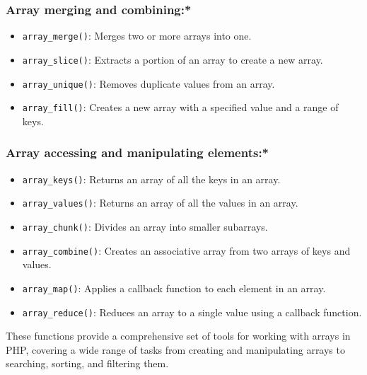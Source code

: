 \documentclass[11pt]{article}
\begin{document}
\subsubsection{Array merging and combining:*}
\label{sec:orgc3fad54}
\begin{itemize}
\item \texttt{array\_merge()}: Merges two or more arrays into one.
\item \texttt{array\_slice()}: Extracts a portion of an array to create a new array.
\item \texttt{array\_unique()}: Removes duplicate values from an array.
\item \texttt{array\_fill()}: Creates a new array with a specified value and a range of keys.
\end{itemize}

\subsubsection{Array accessing and manipulating elements:*}
\label{sec:org330c103}
\begin{itemize}
\item \texttt{array\_keys()}: Returns an array of all the keys in an array.
\item \texttt{array\_values()}: Returns an array of all the values in an array.
\item \texttt{array\_chunk()}: Divides an array into smaller subarrays.
\item \texttt{array\_combine()}: Creates an associative array from two arrays of keys and values.
\item \texttt{array\_map()}: Applies a callback function to each element in an array.
\item \texttt{array\_reduce()}: Reduces an array to a single value using a callback function.
\end{itemize}

These functions provide a comprehensive set of tools for working with
arrays in PHP, covering a wide range of tasks from creating and
manipulating arrays to searching, sorting, and filtering them.
\end{document}

